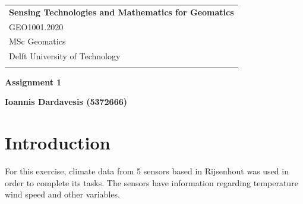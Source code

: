\documentclass[a4paper,12pt]{article} %
\begin{document}



\thispagestyle{empty} %

\begin{tabular}{p{15.5cm}} %
{\large \bf Sensing Technologies and Mathematics for Geomatics} \\
GEO1001.2020 \\ MSc Geomatics \\ Delft University of Technology \\
\hline %
\\
\end{tabular} %

\vspace*{8cm} %

\begin{center} %
	{\Large \bf Assignment 1} %
	\vspace{2mm}
	
	{\bf Ioannis Dardavesis (5372666)} %
		
\end{center}  

\vspace{0.4cm}




\pagebreak
\section{ Introduction}
 For this exercise, climate data from 5 sensors based in Rijsenhout\cite{Maiullari2020} was used in order to complete its tasks. The sensors have information regarding temperature wind speed and other variables.
 
\end{document}
